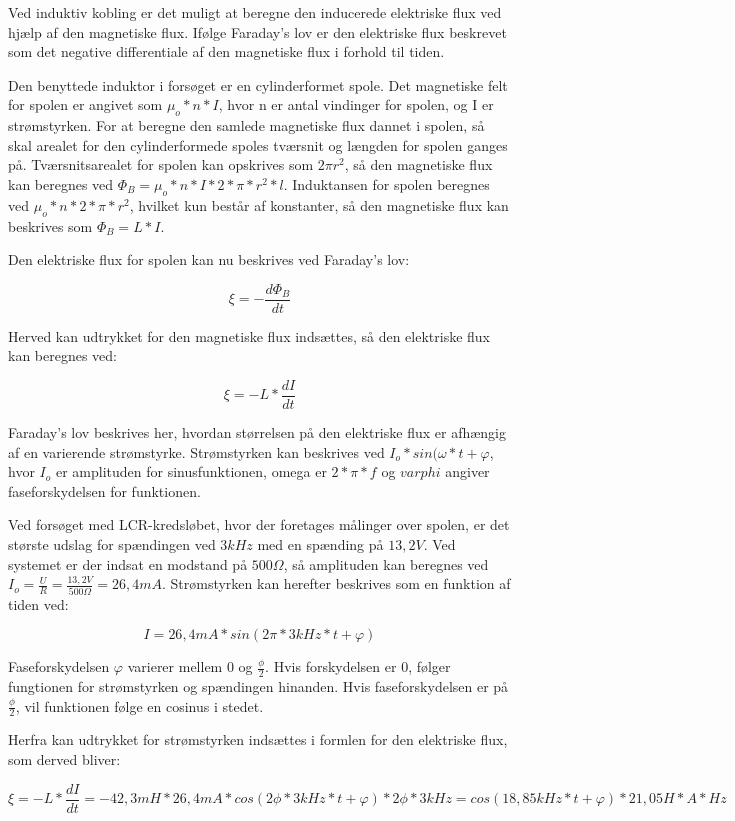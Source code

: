 Ved induktiv kobling er det muligt at beregne den inducerede elektriske flux ved hjælp af den magnetiske flux. Ifølge Faraday's lov er den elektriske flux beskrevet som det negative differentiale af den magnetiske flux i forhold til tiden.

Den benyttede induktor i forsøget er en cylinderformet spole. Det magnetiske felt for spolen er angivet som $\mu_o * n *I$, hvor n er antal vindinger for spolen, og I er strømstyrken. For at beregne den samlede magnetiske flux dannet i spolen, så skal arealet for den cylinderformede spoles tværsnit og længden for spolen ganges på. Tværsnitsarealet for spolen kan opskrives som $2 \pi r^2$, så den magnetiske flux kan beregnes ved $\Phi_B = \mu_o * n * I * 2 * \pi * r^2 * l$. Induktansen for spolen beregnes ved $\mu_o * n * 2 * \pi * r^2$, hvilket kun består af konstanter, så den magnetiske flux kan beskrives som $\Phi_B = L * I$.

Den elektriske flux for spolen kan nu beskrives ved Faraday's lov:

\begin{equation}
\xi = - \frac{d\Phi_B}{dt}
\end{equation}

Herved kan udtrykket for den magnetiske flux indsættes, så den elektriske flux kan beregnes ved:

\begin{equation}
\xi = - L * \frac{dI}{dt}
\end{equation}

Faraday's lov beskrives her, hvordan størrelsen på den elektriske flux er afhængig af en varierende strømstyrke. Strømstyrken kan beskrives ved $I_o * sin(\omega * t + \varphi$, hvor $I_o$ er amplituden for sinusfunktionen, omega er $2 * \pi * f$ og $varphi$ angiver faseforskydelsen for funktionen.

Ved forsøget med LCR-kredsløbet, hvor der foretages målinger over spolen, er det største udslag for spændingen ved $3 kHz$ med en spænding på $13,2 V$. Ved systemet er der indsat en modstand på $500 \Omega$, så amplituden kan beregnes ved $I_o = \frac{U}{R} = \frac{13,2 V}{500 \Omega} = 26,4 mA$. Strømstyrken kan herefter beskrives som en funktion af tiden ved:

\begin{equation}
I = 26,4 mA * sin(2 \pi * 3 kHz * t + \varphi)
\end{equation}

Faseforskydelsen $\varphi$ varierer mellem 0 og $\frac{\phi}{2}$. Hvis forskydelsen er 0, følger fungtionen for strømstyrken og spændingen hinanden. Hvis faseforskydelsen er på $\frac{\phi}{2}$, vil funktionen følge en cosinus i stedet.

Herfra kan udtrykket for strømstyrken indsættes i formlen for den elektriske flux, som derved bliver:

\begin{equation}
\xi = - L * \frac{dI}{dt} = - 42,3 mH * 26,4 mA * cos(2 \phi * 3 kHz * t +\varphi) * 2 \phi * 3 kHz = cos(18,85 kHz * t + \varphi) * 21,05 H * A * Hz
\end{equation}